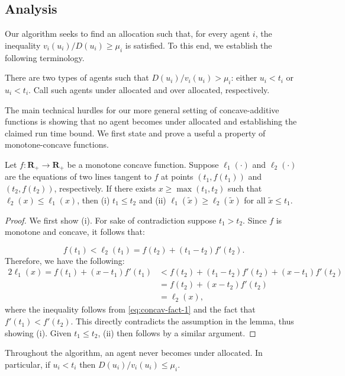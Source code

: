 \subsection{Analysis}
\label{subsec:pd-analysis}
Our algorithm seeks to find an allocation such that, for every agent $i$, the inequality $v_i(u_i) / D(u_i) \geq \mu_i$ is satisfied. To this end, we establish the following terminology.

\begin{definition}
There are two types of agents such that $D(u_i)/v_i(u_i) > \mu_i$: either $u_i < t_i$ or $u_i < t_i$. 
Call such agents under allocated and over allocated, respectively. 
\end{definition}

The main technical hurdles for our more general setting of concave-additive functions is showing that no agent becomes under allocated and establishing the claimed run time bound. We first state and prove a useful a property of monotone-concave functions. 

\begin{lemma}
\label{fact:concave-fact}
Let $f:\mathbf{R}_+\rightarrow \mathbf{R}_+$ be a monotone concave function. Suppose $\ell_1(\cdot)$ and $\ell_2(\cdot)$ are the equations of two lines tangent to $f$ at points $(t_1, f(t_1))$ and $(t_2, f(t_2))$, respectively. If there exists $x \geq \max(t_1, t_2)$ such that $\ell_2(x) \leq \ell_1(x)$, then (i) $t_1 \leq t_2$ and (ii) $\ell_1(\tilde x) \geq \ell_2(\tilde x)$ for all $\tilde x \leq t_1$.
\end{lemma}

\begin{proof}
We first show (i). For sake of contradiction suppose $t_1 > t_2$. Since $f$ is monotone and concave, it follows that:

\begin{equation}
\label{eq:concav-fact-1}
f(t_1) < \ell_2(t_1) = f(t_2) + (t_1 - t_2)f'(t_2).
\end{equation}
Therefore, we have the following:
\begin{alignat*}{2}
\ell_1(x)  = f(t_1) + (x- t_1)f'(t_1)  &< f(t_2) + (t_1 - t_2)f'(t_2) + (x - t_1)f'(t_2) \\
& = f(t_2) + (x - t_2)f'(t_2) \\
& = \ell_2(x),
\end{alignat*}
where the inequality follows from \eqref{eq:concav-fact-1} and the fact that $f'(t_1) < f'(t_2)$. This directly contradicts the assumption in the lemma, thus showing (i). Given $t_1 \leq t_2$, (ii) then follows by a similar argument. 
\end{proof} 
\begin{lemma} \label{lem:under-bad}
Throughout the algorithm, an agent never becomes under allocated. In particular, if $u_i < t_i$ then  $D(u_i)/ v_i(u_i) \leq \mu_i$.
\end{lemma}

